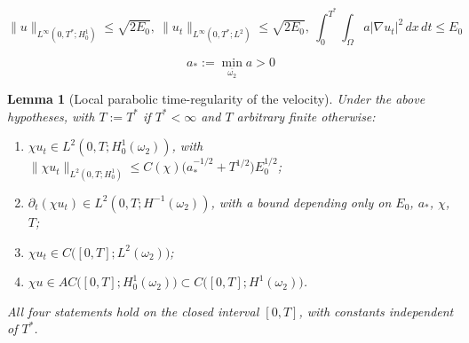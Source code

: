 \documentclass[10pt,a4paper]{amsart}
\newtheorem{lemma}{Lemma}
\newcommand{\Om}{\Omega}
\begin{document}
\begin{equation}\label{eq:two-bounds}
\|u\|_{L^\infty(0,T^*;H_0^1)}\le\sqrt{2E_0},~
\|u_t\|_{L^\infty(0,T^*;L^2)}\le\sqrt{2E_0},~
\int_0^{T^*}\!\!\!\int_\Om a|\nabla u_t|^2\,dx\,dt\le E_0
\end{equation}

\begin{equation}\label{eq:astar}
a_*:=\min_{\overline{\omega_2}}a>0
\end{equation}

\begin{lemma}[Local parabolic time-regularity of the velocity]\label{lem:chain}
Under the above hypotheses, with $T:=T^*$ if $T^*<\infty$ and $T$ arbitrary finite otherwise:
\begin{enumerate}
\item[\rm(i)] $\chi u_t \in L^2(0,T;H_0^1(\omega_2))$, with
$\|\chi u_t\|_{L^2(0,T;H^1_0)}\le C(\chi)\big(a_*^{-1/2}+T^{1/2}\big)E_0^{1/2}$;
\item[\rm(ii)] $\partial_t(\chi u_t)\in L^2(0,T;H^{-1}(\omega_2))$, with a bound depending only on
$E_0$, $a_*$, $\chi$, $T$;
\item[\rm(iii)] $\chi u_t \in C\big([0,T];L^2(\omega_2)\big)$;
\item[\rm(iv)] $\chi u \in AC\big([0,T];H_0^1(\omega_2)\big)\subset C\big([0,T];H^1(\omega_2)\big)$.
\end{enumerate}
All four statements hold on the \emph{closed} interval $[0,T]$, with constants independent of
$T^*$.
\end{lemma}
\end{document}
